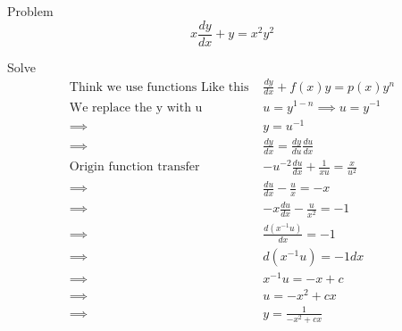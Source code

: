 \documentclass {article}
\begin{document}
Problem  \[ x \frac{{d}y}{{d}x} + y = x^{2}y^{2}\]

Solve 
\[
\begin{matrix}
\text{Think we use functions Like this }  & \frac{{d}y}{{d}x} + f(x)y = p(x)y^n   \\
\text{We replace the y with u } & u = y ^{1-n} \implies u = y^{-1} \\
\implies & y = u^{-1} \\
\implies & \frac{{d}y}{{d}x} = \frac{{d}y}{{d}u} \frac{{d}u}{{d}x} \\
\text{Origin function transfer } & - u^{-2} \frac{{d}u}{{d}x} + \frac{1}{xu} = \frac{x}{u^2} \\
\implies & \frac{{d}u}{{d}x} - \frac{u}{x} = -x \\
\implies & -x \frac{{d}u}{{d}x} - \frac{u}{x^2} = -1 \\
\implies & \frac{{d}(x^{-1}u)}{{d}x} = -1 \\
\implies & {d}(x^{-1}u) = -1 {d}x \\
\implies & x^{-1}u = -x + c \\
\implies & u = -x^{2} + cx \\
\implies & y = \frac{1} {-x^{2} + cx}

\end{matrix}
\]
\end{document}
